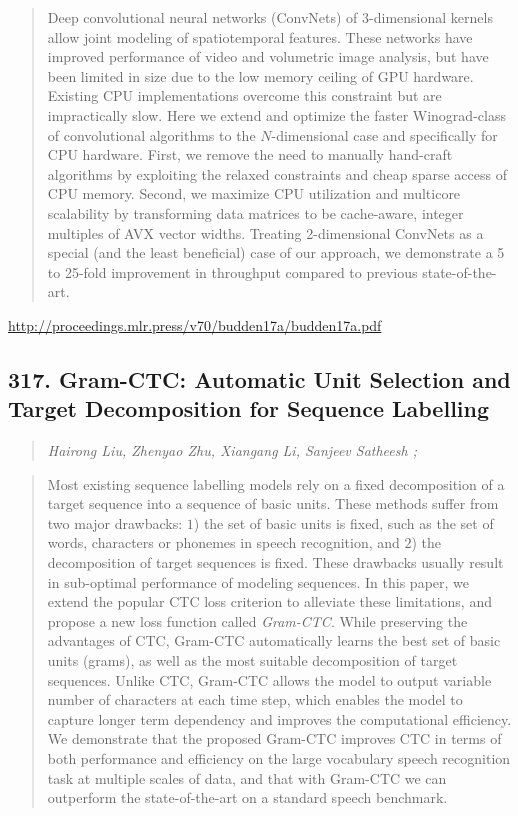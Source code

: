 \documentclass{article}
\begin{document}
\begin{quote}
    Deep convolutional neural networks (ConvNets) of 3-dimensional kernels allow joint modeling of spatiotemporal features. These networks have improved performance of video and volumetric image analysis, but have been limited in size due to the low memory ceiling of GPU hardware. Existing CPU implementations overcome this constraint but are impractically slow. Here we extend and optimize the faster Winograd-class of convolutional algorithms to the $N$-dimensional case and specifically for CPU hardware. First, we remove the need to manually hand-craft algorithms by exploiting the relaxed constraints and cheap sparse access of CPU memory. Second, we maximize CPU utilization and multicore scalability by transforming data matrices to be cache-aware, integer multiples of AVX vector widths. Treating 2-dimensional ConvNets as a special (and the least beneficial) case of our approach, we demonstrate a 5 to 25-fold improvement in throughput compared to previous state-of-the-art.  
\end{quote}

\href{http://proceedings.mlr.press/v70/budden17a/budden17a.pdf}{http://proceedings.mlr.press/v70/budden17a/budden17a.pdf}

\subsection{317. Gram-CTC: Automatic Unit Selection and Target Decomposition for Sequence Labelling}

\begin{quote}
\footnotesize{\textit{Hairong Liu, Zhenyao Zhu, Xiangang Li, Sanjeev Satheesh ;}}

\end{quote}

\begin{quote}
    Most existing sequence labelling models rely on a fixed decomposition of a target sequence into a sequence of basic units. These methods suffer from two major drawbacks: $1$) the set of basic units is fixed, such as the set of words, characters or phonemes in speech recognition, and $2$) the decomposition of target sequences is fixed. These drawbacks usually result in sub-optimal performance of modeling sequences. In this paper, we extend the popular CTC loss criterion to alleviate these limitations, and propose a new loss function called \textit{Gram-CTC}. While preserving the advantages of CTC, Gram-CTC automatically learns the best set of basic units (grams), as well as the most suitable decomposition of target sequences. Unlike CTC, Gram-CTC allows the model to output variable number of characters at each time step, which enables the model to capture longer term dependency and improves the computational efficiency. We demonstrate that the proposed Gram-CTC improves CTC in terms of both performance and efficiency on the large vocabulary speech recognition task at multiple scales of data, and that with Gram-CTC we can outperform the state-of-the-art on a standard speech benchmark.  
\end{quote}
\end{document}
